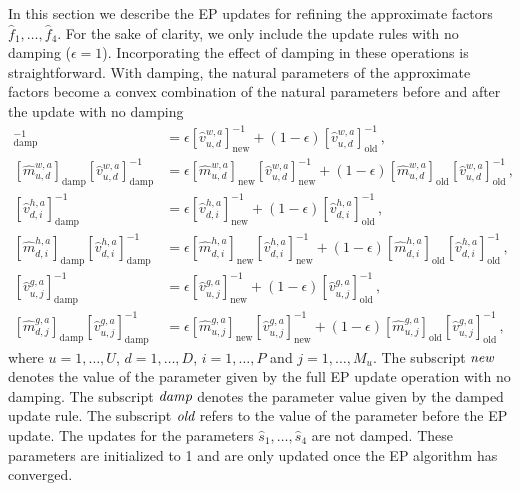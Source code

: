\documentclass{article}
\begin{document}
In this section we describe the EP updates for refining the approximate factors $\hat{f}_1,\ldots,\hat{f}_4$.
For the sake of clarity, we only include the update rules with no damping ($\epsilon = 1$).
Incorporating the effect of damping in these operations is straightforward. 
With damping,  the natural parameters of the approximate factors become 
a convex combination of the natural parameters before and after the 
update with no damping
\begin{align}
[\hat{v}_{u,d}^{w,a}]^{-1}_\text{damp} & = \epsilon [\hat{v}_{u,d}^{w,a}]^{-1}_\text{new}
+ (1 - \epsilon) [\hat{v}_{u,d}^{w,a}]^{-1}_\text{old}\,,\\
[\hat{m}_{u,d}^{w,a}]_\text{damp} [\hat{v}_{u,d}^{w,a}]_\text{damp}^{-1} & =
\epsilon [\hat{m}_{u,d}^{w,a}]_\text{new} [\hat{v}_{u,d}^{w,a}]_\text{new}^{-1} + (1 - \epsilon)
[\hat{m}_{u,d}^{w,a}]_\text{old}[\hat{v}_{u,d}^{w,a}]^{-1}_\text{old}\,,\\
[\hat{v}_{d,i}^{h,a}]^{-1}_\text{damp} & = \epsilon [\hat{v}_{d,i}^{h,a}]^{-1}_\text{new}
+ (1 - \epsilon) [\hat{v}_{d,i}^{h,a}]^{-1}_\text{old}\,,\\
[\hat{m}_{d,i}^{h,a}]_\text{damp} [\hat{v}_{d,i}^{h,a}]_\text{damp}^{-1} & =
\epsilon [\hat{m}_{d,i}^{h,a}]_\text{new} [\hat{v}_{d,i}^{h,a}]_\text{new}^{-1} + (1 - \epsilon)
[\hat{m}_{d,i}^{h,a}]_\text{old}[\hat{v}_{d,i}^{h,a}]^{-1}_\text{old}\,,\\
[\hat{v}_{u,j}^{g,a}]^{-1}_\text{damp} & = \epsilon [\hat{v}_{u,j}^{g,a}]^{-1}_\text{new}
+ (1 - \epsilon) [\hat{v}_{u,j}^{g,a}]^{-1}_\text{old}\,,\\
[\hat{m}_{d,j}^{g,a}]_\text{damp} [\hat{v}_{u,j}^{g,a}]_\text{damp}^{-1} & =
\epsilon [\hat{m}_{u,j}^{g,a}]_\text{new} [\hat{v}_{u,j}^{g,a}]_\text{new}^{-1} + (1 - \epsilon)
[\hat{m}_{u,j}^{g,a}]_\text{old}[\hat{v}_{u,j}^{g,a}]^{-1}_\text{old}\,,
\end{align}
where $u = 1,\ldots,U$, $d = 1,\ldots,D$, $i = 1,\ldots,P$ and $j=1,\ldots,M_u$.
The subscript $\emph{new}$ denotes the value of the parameter 
given by the full EP update operation with no damping.
The subscript $\emph{damp}$ denotes the parameter value given by the
damped update rule. The subscript $\emph{old}$ refers to
the value of the parameter before the EP update.
The updates for the parameters $\hat{s}_1,\ldots,\hat{s}_4$ are not damped. These parameters are initialized to 1 and are only
updated once the EP algorithm has converged.
\end{document}
